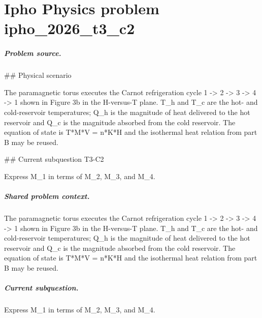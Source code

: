 
\chapter{Ipho Physics problem ipho\_2026\_t3\_c2}
\label{ch:IPhO2026Problems_problem_ipho_2026_t3_c2}

\paragraph{Problem source.}
\#\# Physical scenario

The paramagnetic torus executes the Carnot refrigeration cycle
1 -> 2 -> 3 -> 4 -> 1 shown in Figure 3b in the H-versus-T plane.  T\_h and T\_c
are the hot- and cold-reservoir temperatures; Q\_h is the magnitude of heat
delivered to the hot reservoir and Q\_c is the magnitude absorbed from the cold
reservoir.  The equation of state is T*M*V = n*K*H and the isothermal heat
relation from part B may be reused.

\#\# Current subquestion T3-C2

Express M\_1 in terms of M\_2, M\_3, and M\_4.

\paragraph{Shared problem context.}
The paramagnetic torus executes the Carnot refrigeration cycle
1 -> 2 -> 3 -> 4 -> 1 shown in Figure 3b in the H-versus-T plane.  T\_h and T\_c
are the hot- and cold-reservoir temperatures; Q\_h is the magnitude of heat
delivered to the hot reservoir and Q\_c is the magnitude absorbed from the cold
reservoir.  The equation of state is T*M*V = n*K*H and the isothermal heat
relation from part B may be reused.

\paragraph{Current subquestion.}
Express M\_1 in terms of M\_2, M\_3, and M\_4.

